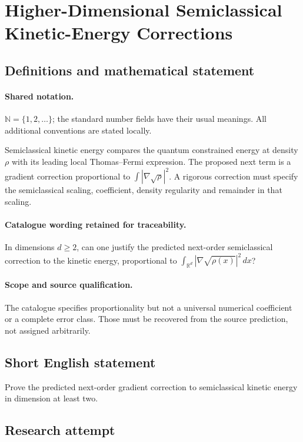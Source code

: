 \documentclass[11pt]{article}
\begin{document}
\section{Higher-Dimensional Semiclassical Kinetic-Energy Corrections}\label{statement}

\subsection{Definitions and mathematical statement}

\paragraph{Shared notation.}$\mathbb N=\{1,2,\ldots\}$; the standard number fields have their usual meanings. All additional conventions are stated locally.


Semiclassical kinetic energy compares the quantum constrained energy at density $\rho$ with its leading local Thomas--Fermi expression. The proposed next term is a gradient correction proportional to $\int|\nabla\sqrt\rho|^2$. A rigorous correction must specify the semiclassical scaling, coefficient, density regularity and remainder in that scaling.

\paragraph{Catalogue wording retained for traceability.}
In dimensions $d\geq2$, can one justify the predicted next-order semiclassical correction to the kinetic energy, proportional to $\int_{\mathbb{R}^d}|\nabla\sqrt{\rho(x)}|^2\,dx$?

\paragraph{Scope and source qualification.}The catalogue specifies proportionality but not a universal numerical coefficient or a complete error class. Those must be recovered from the source prediction, not assigned arbitrarily.
\subsection{Short English statement}
Prove the predicted next-order gradient correction to semiclassical kinetic energy in dimension at least two.
\subsection{Research attempt}
\end{document}
